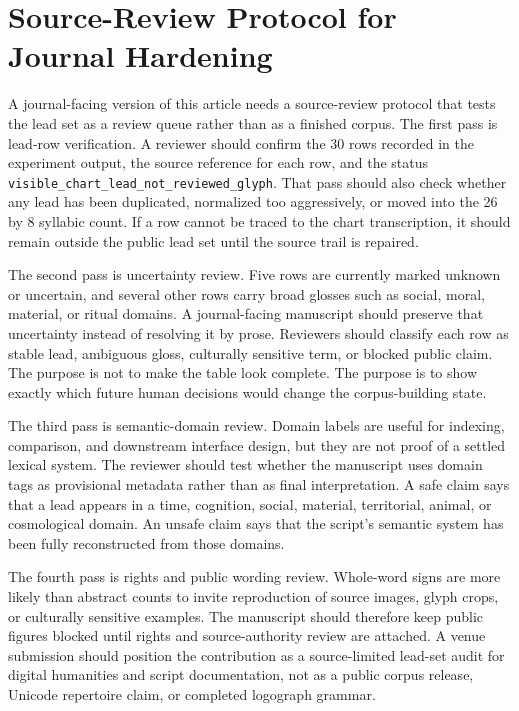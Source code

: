 \documentclass[sigconf,nonacm]{acmart}
\begin{document}
\section{Source-Review Protocol for Journal Hardening}
A journal-facing version of this article needs a source-review protocol that
tests the lead set as a review queue rather than as a finished corpus. The first
pass is lead-row verification. A reviewer should confirm the 30 rows recorded in
the experiment output, the source reference for each row, and the status
\texttt{visible\_chart\_lead\_not\_reviewed\_glyph}. That pass should also check whether any
lead has been duplicated, normalized too aggressively, or moved into the 26 by 8
syllabic count. If a row cannot be traced to the chart transcription, it should
remain outside the public lead set until the source trail is repaired.

The second pass is uncertainty review. Five rows are currently marked unknown or
uncertain, and several other rows carry broad glosses such as social, moral,
material, or ritual domains. A journal-facing manuscript should preserve that
uncertainty instead of resolving it by prose. Reviewers should classify each row
as stable lead, ambiguous gloss, culturally sensitive term, or blocked public
claim. The purpose is not to make the table look complete. The purpose is to
show exactly which future human decisions would change the corpus-building
state.

The third pass is semantic-domain review. Domain labels are useful for indexing,
comparison, and downstream interface design, but they are not proof of a settled
lexical system. The reviewer should test whether the manuscript uses domain tags
as provisional metadata rather than as final interpretation. A safe claim says
that a lead appears in a time, cognition, social, material, territorial, animal,
or cosmological domain. An unsafe claim says that the script's semantic system
has been fully reconstructed from those domains.

The fourth pass is rights and public wording review. Whole-word signs are more
likely than abstract counts to invite reproduction of source images, glyph crops,
or culturally sensitive examples. The manuscript should therefore keep public
figures blocked until rights and source-authority review are attached. A venue
submission should position the contribution as a source-limited lead-set audit
for digital humanities and script documentation, not as a public corpus release,
Unicode repertoire claim, or completed logograph grammar.
\end{document}
